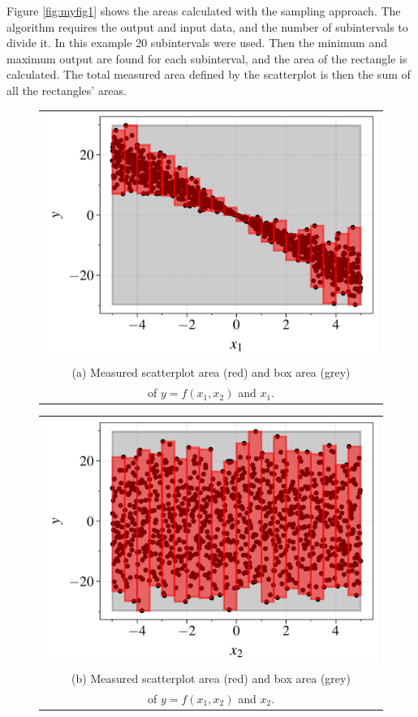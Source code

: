 \documentclass[twocolumn]{rps-esrel2022}
\begin{document}
Figure \ref{fig:myfig1} shows the areas calculated with the sampling approach.
The algorithm requires the output and input data, and the number of subintervals to divide it. In this example 20 subintervals were used.
Then the minimum and maximum output are found for each subinterval, and the area of the rectangle is calculated.
The total measured area defined by the scatterplot is then the sum of all the rectangles' areas.

\begin{figure}[!b]
	\centering
	\begin{tabular}{@{}c@{}}
	  \includegraphics[width=0.94\linewidth]{figures/example_sampling_x1_grid.pdf} \\
	  \small (a) Measured scatterplot area (red) and box area (grey)\\
	  \small of $y=f(x_1,x_2)$ and $x_1$.
	\end{tabular}

	\begin{tabular}{@{}c@{}}
	  \includegraphics[width=0.94\linewidth]{figures/example_sampling_x2_grid.pdf} \\
	  \small (b) Measured scatterplot area (red) and box area (grey)\\
	  \small of $y=f(x_1,x_2)$ and $x_2$.
	\end{tabular}


\end{figure}
\end{document}
